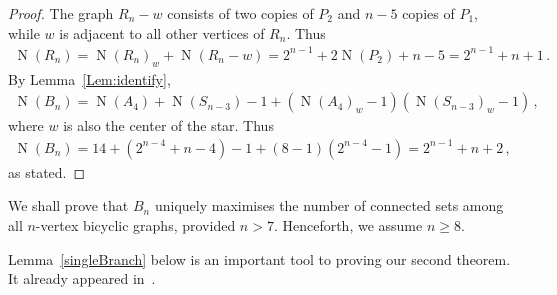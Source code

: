 \documentclass[a4paper,12pt]{amsart}
\theoremstyle{remark}
\DeclareMathOperator{\N}{N}
\begin{document}
\begin{proof}
The graph $R_n-w$ consists of two copies of $P_2$ and $n-5$ copies of $P_1$, while $w$ is adjacent to all other vertices of $R_n$. Thus
\begin{align*}
\N(R_n)=\N(R_n)_w + \N(R_n-w)=2^{n-1}+ 2\N(P_2)+ n-5=2^{n-1}+n+1\,.
\end{align*}
By Lemma~\ref{Lem:identify},
\begin{align*}
\N(B_n)=\N(A_4)+\N(S_{n-3}) -1 + (\N(A_4)_w -1 )(\N(S_{n-3})_w -1 )\,,
\end{align*}
where $w$ is also the center of the star. Thus
\begin{align*}
\N(B_n)=14 +(2^{n-4}+n-4) -1 + (8 -1 )(2^{n-4}-1 )=2^{n-1}+n+2\,,
\end{align*}
as stated.
\end{proof}

\medskip
We shall prove that $B_n$ uniquely maximises the number of connected sets among all $n$-vertex bicyclic graphs, provided $n>7$. Henceforth, we assume $n\geq 8$.

\medskip

Lemma~\ref{singleBranch} below is an important tool to proving our second theorem. It already appeared in~\cite{AudaceGirth2018,AudTOUT}.
\end{document}

